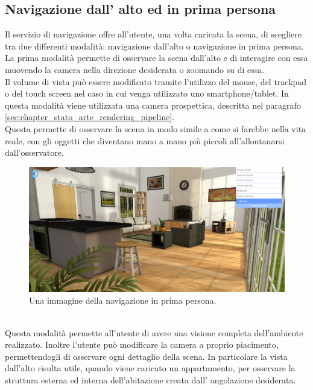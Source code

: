 \subsection{Navigazione dall' alto ed in prima persona}
Il servizio di navigazione offre all’utente, una volta caricata la scena, di scegliere tra due differenti modalità: navigazione dall’alto o navigazione in prima persona.
\\
La prima modalità permette di osservare la scena dall’alto e di interagire con essa muovendo la camera nella direzione desiderata o zoomando su di essa. 
\\
Il volume di vista può essere modificato tramite l’utilizzo del mouse, del trackpad o del touch screen nel caso in cui venga utilizzato uno smartphone/tablet.
In questa modalità viene utilizzata una camera prospettica, descritta nel paragrafo \ref{sec:chapter_stato_arte_rendering_pipeline}. 
\\
Questa permette di osservare la scena in modo simile a come si farebbe nella vita reale, con gli oggetti che diventano mano a mano più piccoli all’allontanarsi dall’osservatore.
\\
\begin{figure}[htb]
 \centering
 \includegraphics[width=1\linewidth]{images/chapter_navigazione_scena/navigator_persp.png}\hfill
 \caption[Navigazione in prima persona]{Una immagine della navigazione in prima persona.}
 \label{fig:navigazione_scena_navigator_persp}
\end{figure}
\\
Questa modalità permette all’utente di avere una visione completa dell’ambiente realizzato. Inoltre l’utente può modificare la camera a proprio piacimento, permettendogli di osservare ogni dettaglio della scena.
In particolare la vista dall’alto risulta utile, quando viene caricato un appartamento, per osservare la struttura esterna ed interna dell’abitazione creata dall’ angolazione desiderata.

